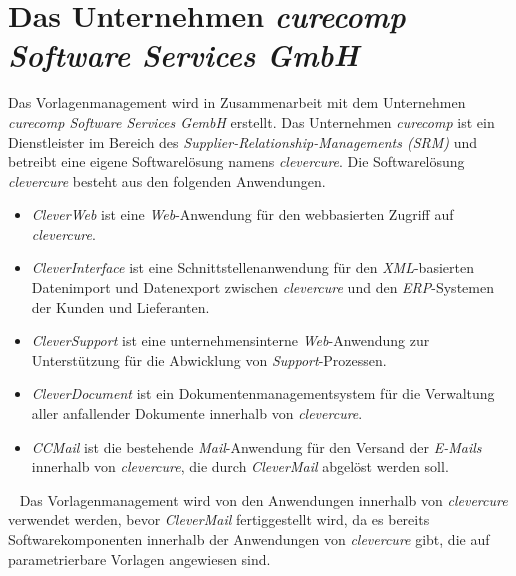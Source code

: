 \section{Das Unternehmen \emph{curecomp Software Services GmbH}}
Das Vorlagenmanagement wird in Zusammenarbeit mit dem Unternehmen \emph{curecomp Software Services GembH} erstellt. Das Unternehmen \emph{curecomp} ist ein Dienstleister im Bereich des \emph{Supplier-Relationship-Managements (SRM)} und betreibt eine eigene Softwarelösung namens \emph{clevercure}. Die Softwarelösung \emph{clevercure} besteht aus den folgenden Anwendungen.
\newline
\begin{itemize}
	\item\emph{CleverWeb} 
	\newline
	ist eine \emph{Web}-Anwendung für den webbasierten Zugriff auf \emph{clevercure}.
	\item\emph{CleverInterface} 
	\newline
	ist eine Schnittstellenanwendung für den \emph{XML}-basierten Datenimport und Datenexport zwischen \emph{clevercure} und den \emph{ERP}-Systemen der Kunden und Lieferanten.
	\item\emph{CleverSupport} 
	\newline
	ist eine unternehmensinterne \emph{Web}-Anwendung zur Unterstützung für die Abwicklung von \emph{Support}-Prozessen.
	\item\emph{CleverDocument} 
	\newline
	ist ein Dokumentenmanagementsystem für die Verwaltung aller anfallender Dokumente innerhalb von \emph{clevercure}.
	\item\emph{CCMail} 
	\newline
	ist die bestehende \emph{Mail}-Anwendung für den Versand der \emph{E-Mails} innerhalb von \emph{clevercure}, die durch \emph{CleverMail} abgelöst werden soll.
\end{itemize}
\ \newline
Das Vorlagenmanagement wird von den Anwendungen innerhalb von \emph{clevercure} verwendet werden, bevor \emph{CleverMail} fertiggestellt wird, da es bereits Softwarekomponenten innerhalb der Anwendungen von \emph{clevercure} gibt, die auf parametrierbare Vorlagen angewiesen sind.

